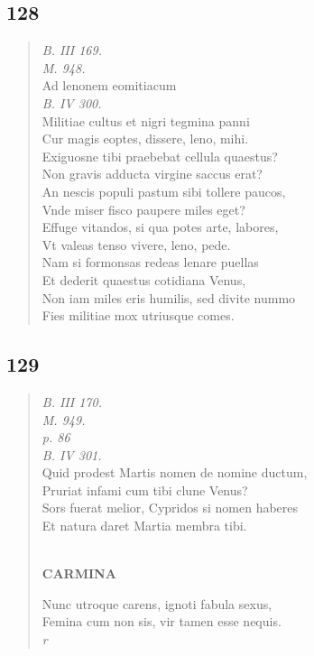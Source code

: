 \documentclass[11pt, a4paper]{report}
\begin{document}
            \subsection*{128}
      \begin{verse}
      \textit{B. III 169.} \\ \textit{M. 948.} \\ Ad lenonem eomitiacum \\ \textit{B. IV 300.} \\ Militiae cultus et nigri tegmina panni \\ Cur magis eoptes, dissere, leno, mihi. \\ Exiguosne tibi praebebat cellula quaestus? \\ Non gravis adducta virgine saccus erat? \\ An nescis populi pastum sibi tollere paucos, \\ Vnde miser fisco paupere miles eget? \\ Effuge vitandos, si qua potes arte, labores, \\ Vt valeas tenso vivere, leno, pede. \\ Nam si formonsas redeas lenare puellas \\ Et dederit quaestus cotidiana Venus, \\ Non iam miles eris humilis, sed divite nummo \\ Fies militiae mox utriusque comes. \\ 
      \end{verse}
  
            \subsection*{129}
      \begin{verse}
      \textit{B. III 170.} \\ \textit{M. 949.} \\ \textit{p. 86} \\ \textit{B. IV 301.} \\ Quid prodest Martis nomen de nomine ductum, \\ Pruriat infami cum tibi clune Venus? \\ Sors fuerat melior, Cypridos si nomen haberes \\ Et natura daret Martia membra tibi. \\ 
        ﻿\pagebreak 
     \marginpar{[138]} \begin{center} \textbf{CARMINA} \end{center}Nunc utroque carens, ignoti fabula sexus, \\ Femina cum non sis, vir tamen esse nequis. \\ \textit{r} \\ 
      \end{verse}
  
\end{document}
